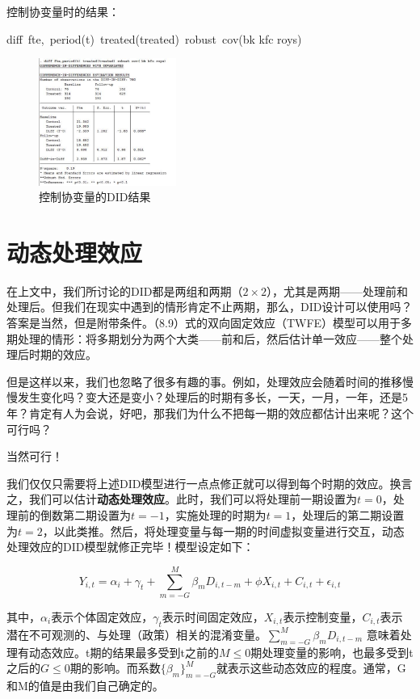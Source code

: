 \documentclass[cn,12pt,math=newtx,citestyle=gb7714-2015,bibstyle=gb7714-2015]{elegantbook}
\begin{document}
	控制协变量时的结果：
	
	diff~fte,~period(t)~treated(treated)~robust~cov(bk kfc roys)
	\begin{figure}[htbp!]
		\centering
		\includegraphics[width=0.4\textwidth]{DIDcov.jpg}
		\caption{控制协变量的DID结果}\label{fig:digit}
	\end{figure}
	
	
	\section{动态处理效应}
	
	在上文中，我们所讨论的DID都是两组和两期（$2 \times 2$），尤其是两期——处理前和处理后。但我们在现实中遇到的情形肯定不止两期，那么，DID设计可以使用吗？答案是当然，但是附带条件。（8.9）式的双向固定效应（TWFE）模型可以用于多期处理的情形：将多期划分为两个大类——前和后，然后估计单一效应——整个处理后时期的效应。
	
	但是这样以来，我们也忽略了很多有趣的事。例如，处理效应会随着时间的推移慢慢发生变化吗？变大还是变小？处理后的时期有多长，一天，一月，一年，还是5年？肯定有人为会说，好吧，那我们为什么不把每一期的效应都估计出来呢？这个可行吗？
	
	当然可行！
	
	我们仅仅只需要将上述DID模型进行一点点修正就可以得到每个时期的效应。换言之，我们可以估计\textbf{动态处理效应}。此时，我们可以将处理前一期设置为$t=0$，处理前的倒数第二期设置为$t=-1$，实施处理的时期为$t=1$，处理后的第二期设置为$t=2$，以此类推。然后，将处理变量与每一期的时间虚拟变量进行交互，动态处理效应的DID模型就修正完毕！模型设定如下：
	
	\begin{equation}
		Y_{i,t} = \alpha_i + \gamma_t + \sum_{m = -G}^{M} \beta_m D_{i,t-m} + \phi X_{i,t} + C_{i,t} + \epsilon_{i,t}
	\end{equation}
	
	其中，$\alpha_i$表示个体固定效应，$\gamma_t$表示时间固定效应，$X_{i,t}$表示控制变量，$C_{i,t}$表示潜在不可观测的、与处理（政策）相关的混淆变量。$ \sum_{m = -G}^{M} \beta_m D_{i,t-m} $ 意味着处理有动态效应。t期的结果最多受到t之前的$M \le 0 $期处理变量的影响，也最多受到t之后的$G \le 0$期的影响。而系数$\{\beta_m\}_{m=-G}^{M}$就表示这些动态效应的程度。通常，G和M的值是由我们自己确定的。
	
\end{document}
